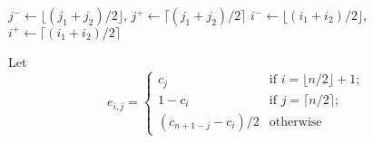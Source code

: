 \documentclass[letterpaper]{article} %
\newtheorem{lemma}[thm]{Lemma}
\DeclareMathOperator{\support}{support}
\begin{document}
	\begin{procedure}
		\DontPrintSemicolon
		$j^- \gets \lfloor (j_1+j_2)/2 \rfloor$,
		$j^+ \gets \lceil (j_1+j_2)/2 \rceil$\;
		$i^- \gets \lfloor (i_1+i_2)/2 \rfloor$,
		$i^+ \gets \lceil (i_1+i_2)/2 \rceil$\;

		
		\caption{{$split(((i_1,j_1),(i_2,j_2)))$}()}
		\label{proc:split}
	\end{procedure}
	
	
	
	Let 
	$$e_{i,j} = \begin{cases}
	c_j   & \text{if } i=\lfloor n/2 \rfloor+1; \\
	1-c_i & \text{if } j=\lceil n/2 \rceil; \\
	(c_{n+1-j} {-} c_i)/2  & \text{otherwise}
	\end{cases}$$












\end{document}
